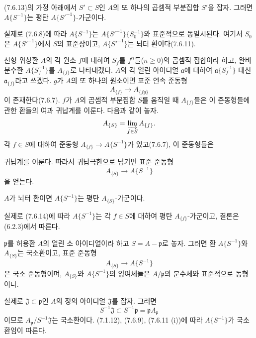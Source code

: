 \begin{corollary}[7.6.14]
\label{0.7.6.14-ko}
(7.6.13)의 가정 아래에서 $S'\subset S$인 $A$의 또 하나의 곱셈적
부분집합 $S'$을 잡자. 그러면 $A\{S^{-1}\}$는 평탄
$A\{{S'}^{-1}\}$-가군이다.
\end{corollary}

실제로 (7.6.8)에 따라 $A\{S^{-1}\}$는
$A\{{S'}^{-1}\}\{S_0^{-1}\}$와 표준적으로 동일시된다. 여기서
$S_0$은 $A\{{S'}^{-1}\}$에서 $S$의 표준상이고,
$A\{{S'}^{-1}\}$는 뇌터 환이다(7.6.11).

\begin{env}[7.6.15]
\label{0.7.6.15-ko}
선형 위상환 $A$의 각 원소 $f$에 대하여 $S_f$를
$f^n$들($n\geq0$)의 곱셈적 집합이라 하고, 완비 분수환
$A\{S_f^{-1}\}$를 $A_{\{f\}}$로 나타내겠다. $A$의 각 열린
아이디얼 $\mathfrak a$에 대하여
$\mathfrak a\{S_f^{-1}\}$ 대신 $\mathfrak a_{\{f\}}$라고 쓰겠다.
$g$가 $A$의 또 하나의 원소이면 표준 연속 준동형
\[
  A_{\{f\}}\longrightarrow A_{\{fg\}}
\]
이 존재한다(7.6.7). $f$가 $A$의 곱셈적 부분집합 $S$를 움직일 때
$A_{\{f\}}$들은 이 준동형들에 관한 환들의 여과 귀납계를 이룬다.
다음과 같이 놓자.
\[
  A_{\{S\}}=\varinjlim_{f\in S}A_{\{f\}}.
\]
각 $f\in S$에 대하여 준동형
$A_{\{f\}}\to A\{S^{-1}\}$가 있고(7.6.7), 이 준동형들은


귀납계를 이룬다. 따라서 귀납극한으로 넘기면 표준 준동형
\[
  A_{\{S\}}\longrightarrow A\{S^{-1}\}
\]
을 얻는다.
\end{env}

\begin{proposition}[7.6.16]
\label{0.7.6.16-ko}
$A$가 뇌터 환이면 $A\{S^{-1}\}$는 평탄 $A_{\{S\}}$-가군이다.
\end{proposition}

실제로 (7.6.14)에 따라 $A\{S^{-1}\}$는 각 $f\in S$에 대하여
평탄 $A_{\{f\}}$-가군이고, 결론은 (6.2.3)에서 따른다.

\begin{proposition}[7.6.17]
\label{0.7.6.17-ko}
$\mathfrak p$를 허용환 $A$의 열린 소 아이디얼이라 하고
$S=A-\mathfrak p$로 놓자. 그러면 환 $A\{S^{-1}\}$와
$A_{\{S\}}$는 국소환이고, 표준 준동형
\[
  A_{\{S\}}\longrightarrow A\{S^{-1}\}
\]
은 국소 준동형이며, $A_{\{S\}}$와 $A\{S^{-1}\}$의 잉여체들은
$A/\mathfrak p$의 분수체와 표준적으로 동형이다.
\end{proposition}

실제로 $\mathfrak J\subset\mathfrak p$인 $A$의 정의 아이디얼
$\mathfrak J$를 잡자. 그러면
\[
  S^{-1}\mathfrak J
  \subset S^{-1}\mathfrak p
  =\mathfrak pA_\mathfrak p
\]
이므로 $A_\mathfrak p/S^{-1}\mathfrak J$는 국소환이다.
(7.1.12), (7.6.9), (7.6.11 (i))에 따라 $A\{S^{-1}\}$가
국소환임이 따른다.

